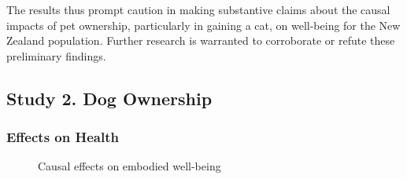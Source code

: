 \documentclass[
  singlecolumn,
  9pt]{article}
\begin{document}
The results thus prompt caution in making substantive claims about the
causal impacts of pet ownership, particularly in gaining a cat, on
well-being for the New Zealand population. Further research is warranted
to corroborate or refute these preliminary findings.

\newpage{}

\subsection{Study 2. Dog Ownership}\label{study-2.-dog-ownership}

\subsubsection{Effects on Health}\label{effects-on-health-1}

\begin{figure}


\caption{\label{fig-results-health-dogs}Causal effects on embodied
well-being}

\end{figure}%

\newpage{}
\end{document}
